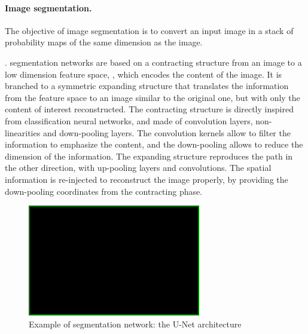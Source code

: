 \paragraph{Image  segmentation.} The objective of image  segmentation is
to convert an input image in a stack of probability maps of the same
dimension as the image. 


.  segmentation networks
are based on a contracting structure from an image to a low dimension
feature space, , which encodes the content of the image. It is branched
to a symmetric expanding structure that translates the information from
the feature space to an image similar to the original one, but with
only the content of interest reconstructed. The contracting structure
is directly inspired from classification neural networks, and made
of convolution layers, non-linearities and down-pooling layers. The
convolution kernels allow to filter the information to emphasize
the content, and the down-pooling allows to reduce the dimension
of the information. The expanding structure reproduces the path in
the other direction, with up-pooling layers and convolutions. The
spatial information is re-injected to reconstruct the image properly,
by providing the down-pooling coordinates from the contracting phase.

\begin{figure}[h!]
    \centering \includegraphics[scale = 0.25]{figures/blank.png}
    \caption{Example of segmentation network: the U-Net architecture
    \cite{ronneberger_u-net:_2015}} \label{fig:unet}
\end{figure}

